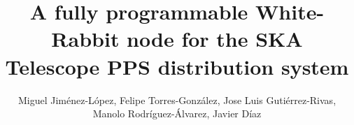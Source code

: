 \documentclass[review]{elsarticle}
\newcommand{\gutinote}[1]{\todo[bordercolor=green, backgroundcolor=yellow, noline]{#1}}
\begin{document}
\begin{frontmatter}

\title{A fully programmable White-Rabbit node for the SKA Telescope PPS distribution system} %


\author{Miguel Jiménez-López, Felipe Torres-González, Jose Luis Gutiérrez-Rivas, Manolo Rodríguez-Álvarez, Javier Díaz}
\address{CITIC, ETSIIT, University of Granada, Spain}






\end{frontmatter}
\end{document}
